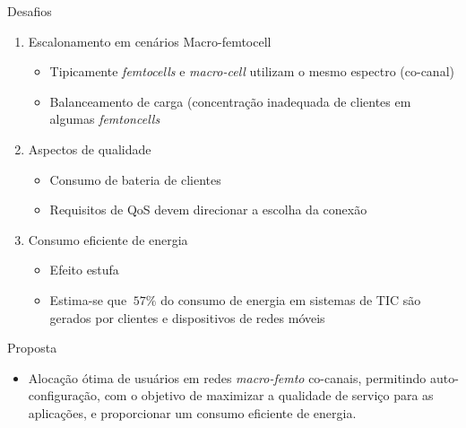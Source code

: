 \begin{frame}
  \begin{block}{Desafios}
    \begin{enumerate}
      \pause
      \item \alert{Escalonamento em cenários Macro-femtocell}
        \begin{itemize}
          \item Tipicamente \textit{femtocells} e \textit{macro-cell} utilizam
          o mesmo espectro (co-canal)
          \item Balanceamento de carga (concentração inadequada de clientes em
          algumas \textit{femtoncells}
        \end{itemize}
      \pause
      \item \alert{Aspectos de qualidade}
        \begin{itemize}
          \item Consumo de bateria de clientes
          \item Requisitos de QoS devem direcionar a escolha da conexão
        \end{itemize}
      \pause
      \item \alert{Consumo eficiente de energia}
        \begin{itemize}
          \item Efeito estufa
          \item Estima-se que $~57\%$ do consumo de energia em sistemas de TIC
          são gerados por clientes e dispositivos de redes móveis
        \end{itemize}
    \end{enumerate}
  \end{block}
\end{frame}

\begin{frame}
  \begin{block}{Proposta}
    \begin{itemize}
      \item \alert{Alocação ótima} de usuários em redes \textit{macro-femto}
      co-canais, permitindo \alert{auto-configuração}, com o objetivo de
      \alert{maximizar a qualidade de serviço} para as aplicações, e
      proporcionar um \alert{consumo eficiente} de energia.
    \end{itemize}
  \end{block}
\end{frame}

